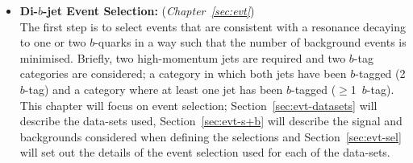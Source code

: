 \begin{itemize}[leftmargin=*]
\item\textbf{Di-$b$-jet Event Selection:} (\textit{Chapter~\ref{sec:evt}})\\
  The first step is to select events that are consistent with a resonance decaying to one or two $b$-quarks
  in a way such that the number of background events is minimised.
  Briefly, two high-momentum jets are required and two $b$-tag categories are considered;
  a category in which both jets have been $b$-tagged (2 $b$-tag) and a category where at least one jet has been $b$-tagged ($\geq$1~$b$-tag).
  This chapter will focus on event selection;
  Section~\ref{sec:evt-datasets} will describe the data-sets used,
  Section~\ref{sec:evt-s+b} will describe the signal and backgrounds
  considered when defining the selections
  and Section~\ref{sec:evt-sel} will set out
  the details of the event selection used for each of the data-sets.  \vspace{0.8em}


\end{itemize}
